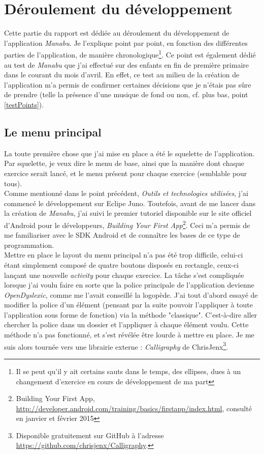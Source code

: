 \section{Déroulement du développement}
Cette partie du rapport est dédiée au déroulement du développement de l'application \textit{Manabu}. Je l'explique point par point, en fonction des différentes parties de l'application, de manière chronologique\footnote{Il se peut qu'il y ait certains sauts dans le temps, des ellipses, dues à un changement d'exercice en cours de développement de ma part}. Ce point est également dédié au test de \textit{Manabu} que j'ai effectué sur des enfants en fin de première primaire dans le courant du mois d'avril. En effet, ce test au milieu de la création de l'application m'a permis de confirmer certaines décisions que je n'étais pas sûre de prendre (telle la présence d'une musique de fond ou non, cf. plus bas, point \ref{testPoints}). 

\subsection{Le menu principal}
La toute première chose que j'ai mise en place a été le squelette de l'application. Par squelette, je veux dire le menu de base, ainsi que la manière dont chaque exercice serait lancé, et le menu présent pour chaque exercice (semblable pour tous). \\

Comme mentionné dans le point précédent, \textit{Outils et technologies utilisées}, j'ai commencé le développement sur Eclipe Juno. Toutefois, avant de me lancer dans la création de \textit{Manabu}, j'ai suivi le premier tutoriel disponible sur le site officiel d'Android pour le développeurs, \textit{Building Your First App}\footnote{Building Your First App, \url{http://developer.android.com/training/basics/firstapp/index.html}, consulté en janvier et février 2015}. Ceci m'a permis de me familiariser avec le SDK Android et de connaître les bases de ce type de programmation.\\

Mettre en place le layout du menu principal n'a pas été trop difficile, celui-ci étant simplement composé de quatre boutons disposés en rectangle, ceux-ci lançant une nouvelle \textit{activity} pour chaque exercice. La tâche s'est compliquée lorsque j'ai voulu faire en sorte que la police principale de l'application devienne \textit{OpenDyslexic}, comme me l'avait conseillé la logopède. J'ai tout d'abord essayé de modifier la police d'un élément (pensant par la suite pouvoir l'appliquer à toute l'application sous forme de fonction) via la méthode "classique". C'est-à-dire aller chercher la police dans un dossier et l'appliquer à chaque élément voulu. Cette méthode n'a pas fonctionné, et s'est révélée être lourde à mettre en place. Je me suis alors tournée vers une librairie externe : \textit{Calligraphy} de ChrisJenx\footnote{Disponible gratuitement sur GitHub à l'adresse \url{https://github.com/chrisjenx/Calligraphy}.}.\\

